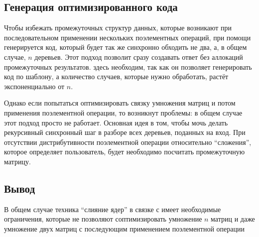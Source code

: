 \subsection{Генерация оптимизированного кода}
Чтобы избежать промежуточных структур данных, которые возникают при последовательном применении нескольких поэлементных операций, при помощи \Th{} генерируется код, который будет так же синхронно обходить не два, а, в общем случае, $n$ деревьев. Этот подход позволит сразу создавать ответ без аллокаций промежуточных результатов. \Th{} здесь необходим, так как он позволяет генерировать код по шаблону, а количество случаев, которые нужно обработать, растёт экспоненциально от $n$.

Однако если попытаться оптимизировать связку умножения матриц и потом применения поэлементной операции, то возникнут проблемы: в общем случае этот подход просто не работает. Основная идея в том, чтобы мочь делать рекурсивный синхронный шаг в разборе всех деревьев, поданных на вход. При отсутствии дистрибутивности поэлементной операции относительно \enquote{сложения}, которое определяет пользователь, будет необходимо посчитать промежуточную матрицу.
\subsection{Вывод}
В общем случае техника \enquote{слияние ядер} в связке с \Th{} имеет необходимые ограничения, которые не позволяют соптимизировать умножение $n$ матриц и даже умножение двух матриц с последующим применением поэлементной операции
